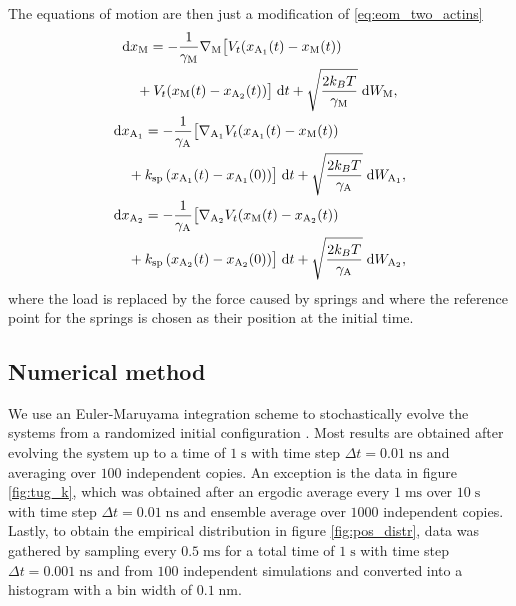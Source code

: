 \documentclass[aps,pre,twocolumn,showpacs,showkeys,superscriptaddress,floatfix]{revtex4-1}
\newcommand{\rmd}{{\mathrm d}}
\begin{document}
The equations of motion are then just a modification of \eqref{eq:eom_two_actins}  
\begin{equation}
\begin{gathered}
\begin{multlined}[b][.45\textwidth]
\rmd x_\text{M} = 
- \frac{1}{\gamma_\text{M}} \nabla_\text{M} \bigl[ 
V_t(x_{\text{A}_1}(t) - x_\text{M}(t)) 
\\
+ V_t(x_\text{M}(t) - x_{\text{A}_2}(t)) 
\bigr] \; \rmd t 
+ \sqrt{ \frac{2 k_B T}{\gamma_\text{M}} } \; \rmd W_\text{M} ,
\end{multlined}\\
\begin{multlined}[b][.45\textwidth]
\rmd x_{\text{A}_1} = 
- \frac{1}{\gamma_\text{A}} \bigl[ \nabla_{\text{A}_1} V_t( x_{\text{A}_1}(t) - x_\text{M}(t) ) 
\\
+ k_\text{sp} \left( x_{\text{A}_1}(t) - x_{\text{A}_1}(0) \right) \bigr] \; \rmd t 
+ \sqrt{ \frac{2 k_B T}{\gamma_\text{A}} } \; \rmd W_{\text{A}_1} ,
\end{multlined}\\
\begin{multlined}[b][.45\textwidth]
\rmd x_{\text{A}_2} = 
- \frac{1}{\gamma_\text{A}} \bigl[ \nabla_{\text{A}_2} V_t( x_\text{M}(t) - x_{\text{A}_2}(t) )
\\
+ k_\text{sp} \left( x_{\text{A}_2}(t) - x_{\text{A}_2}(0) \right) \bigr] \; \rmd t 
+ \sqrt{ \frac{2 k_B T}{\gamma_\text{A}} } \; \rmd W_{\text{A}_2} ,
\end{multlined}
\end{gathered}
\label{eq:eom_two_actins_no_load}
\end{equation}
where the load is replaced by the force caused by springs and where the reference point for the springs is chosen as their position at the initial time. 

\subsection{Numerical method}
We use an Euler-Maruyama integration scheme to stochastically evolve the systems from a randomized initial configuration \cite{kloeden1989survey,maruyama1955continuous}. 
Most results are obtained after evolving the system up to a time of $1\;\mathrm{s}$ with time step $\Delta t = 0.01\;\mathrm{ns}$ and averaging over $100$ independent copies.    
An exception is the data in figure \ref{fig:tug_k}, 
which was obtained after an ergodic average every $1\;\mathrm{ms}$ over $10\;\mathrm{s}$ with time step $\Delta t = 0.01\;\mathrm{ns}$ and ensemble average over $1000$ independent copies.
Lastly, to obtain the empirical distribution in figure \ref{fig:pos_distr}, 
data was gathered by sampling every $0.5\;\mathrm{ms}$ for a total time of $1\;\mathrm{s}$ with time step $\Delta t = 0.001\;\mathrm{ns}$ and from $100$ independent simulations and converted into a histogram with a bin width of $0.1\;\mathrm{nm}$.
\end{document}
